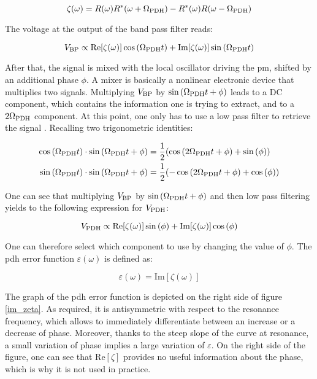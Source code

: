 \begin{equation}
	\zeta(\omega) = R(\omega)R^*(\omega+\Omega_{\text{PDH}})-R^*(\omega)R(\omega-\Omega_{\text{PDH}})
\end{equation}

The voltage at the output of the band pass filter reads:

\begin{equation}
	V_{\text{BP}} \propto \text{Re}[\zeta(\omega)]\cos{(\Omega_{\text{PDH}}t)} + \text{Im}[\zeta(\omega)] \sin{(\Omega_{\text{PDH}}t)}
\end{equation}

After that, the signal is mixed with the local oscillator driving the \gls{pm}, shifted by an additional phase $\phi$. A mixer is basically a nonlinear electronic device that multiplies two signals. Multiplying $V_{\text{BP}}$ by $\sin{(\Omega_{\text{PDH}}t+\phi)}$ leads to a DC component, which contains the information one is trying to extract, and to a $2\Omega_{\text{PDH}}$ component. At this point, one only has to use a low pass filter to retrieve the signal \cite{nickersonreview}. Recalling two trigonometric identities:

\begin{align}
	\cos{(\Omega_{\text{PDH}}t)}\cdot \sin{(\Omega_{\text{PDH}}t+\phi)} &= \frac{1}{2} (\cos{(2\Omega_{\text{PDH}}t+\phi)}+\sin{(\phi)})  \\
	\sin{(\Omega_{\text{PDH}}t)}\cdot \sin{(\Omega_{\text{PDH}}t+\phi)} &= \frac{1}{2} (-\cos{(2\Omega_{\text{PDH}}t+\phi)}+\cos{(\phi)}) 
\end{align}

One can see that multiplying $V_{\text{BP}}$ by $\sin{(\Omega_{\text{PDH}}t+\phi)}$ and then low pass filtering yields to the following expression for $V_{\text{PDH}}$:

\begin{equation}
	V_{\text{PDH}} \propto \text{Re}[\zeta(\omega)]\sin{(\phi)} + \text{Im}[\zeta(\omega)]\cos{(\phi)}
\end{equation}

One can therefore select which component to use by changing the value of $\phi$. The \gls{pdh} error function $\varepsilon(\omega)$ is defined as:

\begin{equation}
	\varepsilon(\omega) = \text{Im}[\zeta(\omega)]
\end{equation}

The graph of the \gls{pdh} error function is depicted on the right side of figure \ref{im_zeta}. As required, it is antisymmetric with respect to the resonance frequency, which allows to immediately differentiate between an increase or a decrease of phase. Moreover, thanks to the steep slope of the curve at resonance, a small variation of phase implies a large variation of $\varepsilon$. On the right side of the figure, one can see that $\text{Re}[\zeta]$ provides no useful information about the phase, which is why it is not used in practice.\\

